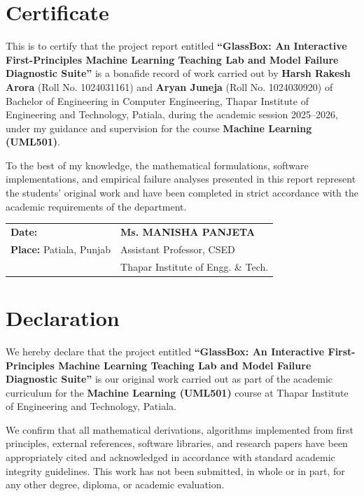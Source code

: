 \documentclass[12pt,a4paper]{report}
\begin{document}
\setcounter{page}{2}

\chapter*{Certificate}
\thispagestyle{fancy}
This is to certify that the project report entitled \textbf{``GlassBox: An Interactive First-Principles Machine Learning Teaching Lab and Model Failure Diagnostic Suite''} is a bonafide record of work carried out by \textbf{Harsh Rakesh Arora} (Roll No. 1024031161) and \textbf{Aryan Juneja} (Roll No. 1024030920) of Bachelor of Engineering in Computer Engineering, Thapar Institute of Engineering and Technology, Patiala, during the academic session 2025--2026, under my guidance and supervision for the course \textbf{Machine Learning (UML501)}.

To the best of my knowledge, the mathematical formulations, software implementations, and empirical failure analyses presented in this report represent the students' original work and have been completed in strict accordance with the academic requirements of the department.

\vspace{2.5cm}
\noindent
\begin{tabular}{p{3.1in}p{3.1in}}
\textbf{Date:} \hrulefill & \textbf{Ms. MANISHA PANJETA} \\
\textbf{Place:} Patiala, Punjab & Assistant Professor, CSED \\
& Thapar Institute of Engg. \& Tech.
\end{tabular}

\newpage

\chapter*{Declaration}
\thispagestyle{fancy}
We hereby declare that the project entitled \textbf{``GlassBox: An Interactive First-Principles Machine Learning Teaching Lab and Model Failure Diagnostic Suite''} is our original work carried out as part of the academic curriculum for the \textbf{Machine Learning (UML501)} course at Thapar Institute of Engineering and Technology, Patiala.

We confirm that all mathematical derivations, algorithms implemented from first principles, external references, software libraries, and research papers have been appropriately cited and acknowledged in accordance with standard academic integrity guidelines. This work has not been submitted, in whole or in part, for any other degree, diploma, or academic evaluation.
\end{document}
